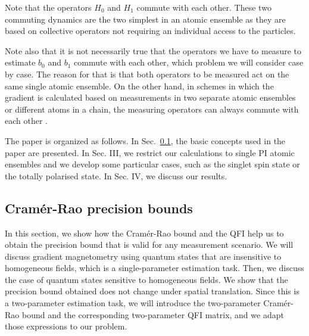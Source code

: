 Note that the operators $H_{0}$ and $H_{1}$ commute with each other.
These two commuting dynamics are the two simplest in an atomic ensemble as
they are based on collective operators not requiring an individual access to
the particles.

Note also that it is not necessarily
true that the operators we have to measure to estimate $b_0$ and $b_1$
commute with each other, which problem we will consider case by case.
The reason for that is that both operators to be measured
act on the same single atomic ensemble.
On the other hand, in schemes in which the gradient is calculated
based on measurements in two separate atomic ensembles or
different atoms in a chain, the measuring operators can always commute
with each other \citep{Wasilewski2010,Eckert2006,Zhang2014}.

The paper is organized as follows. In Sec.~\ref{sec:cramer-rao bounds}, the
basic concepts used in the paper are presented.
In Sec. III, we restrict our calculations to single PI atomic ensembles and we
develop some particular cases, such as the singlet spin state
or the totally polarised state. In Sec. IV, we discuss our results.

\subsection{Cram\'er-Rao precision bounds}
\label{sec:cramer-rao bounds}

In this section, we show how the Cram\'er-Rao bound and the QFI help us to obtain the precision bound that is valid for any measurement scenario.
We will discuss gradient magnetometry using quantum states that are insensitive to homogeneous fields, which is a single-parameter estimation task.
Then, we discuss the case of quantum states sensitive to homogeneous fields.
We show that the precision bound obtained does not change under spatial translation.
Since this is a two-parameter estimation task, we will introduce the two-parameter Cram\'er-Rao bound and the corresponding two-parameter QFI matrix, and we adapt those expressions to our problem.

